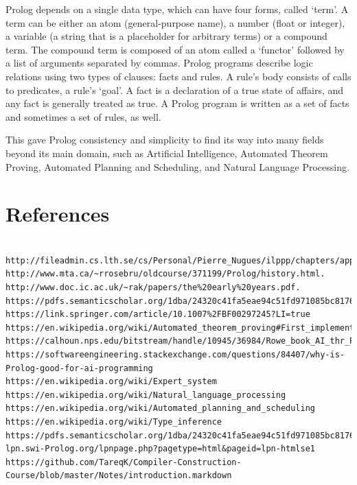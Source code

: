 \documentclass[14pt]{article}
\begin{document}
Prolog depends on a single data type, which can have four forms,
called ‘term’. A term can be either an atom (general-purpose name), a
number (float or integer), a variable (a string that is a placeholder
for arbitrary terms) or a compound term. The compound term is composed
of an atom called a ‘functor’ followed by a list of arguments
separated by commas. Prolog programs describe logic relations using two
types of clauses: facts and rules. A rule’s body consists of calls to
predicates, a rule’s ‘goal’. A fact is a declaration of a true state
of affairs, and any fact is generally treated as true. A Prolog
program is written as a set of facts and sometimes a set of rules, as
well.

This gave Prolog consistency and simplicity to find its way into many
fields beyond its main domain, such as Artificial Intelligence,
Automated Theorem Proving, Automated Planning and Scheduling, and
Natural Language Processing.

\newpage
\section{References} 
\begin{verbatim}
	
http://fileadmin.cs.lth.se/cs/Personal/Pierre_Nugues/ilppp/chapters/appA.pdf.
http://www.mta.ca/~rrosebru/oldcourse/371199/Prolog/history.html. 
http://www.doc.ic.ac.uk/~rak/papers/the%20early%20years.pdf.
https://pdfs.semanticscholar.org/1dba/24320c41fa5eae94c51fd971085bc8176dd7.pdf
https://link.springer.com/article/10.1007%2FBF00297245?LI=true
https://en.wikipedia.org/wiki/Automated_theorem_proving#First_implementations
https://calhoun.nps.edu/bitstream/handle/10945/36984/Rowe_book_AI_thr_Prolog_preface.pdf https://softwareengineering.stackexchange.com/questions/84407/why-is-Prolog-good-for-ai-programming
https://en.wikipedia.org/wiki/Expert_system
https://en.wikipedia.org/wiki/Natural_language_processing 
https://en.wikipedia.org/wiki/Automated_planning_and_scheduling 
https://en.wikipedia.org/wiki/Type_inference https://pdfs.semanticscholar.org/1dba/24320c41fa5eae94c51fd971085bc8176dd7.pdfhttps://en.wikipedia.org/wiki/Prolog
lpn.swi-Prolog.org/lpnpage.php?pagetype=html&pageid=lpn-htmlse1
https://github.com/TareqK/Compiler-Construction-Course/blob/master/Notes/introduction.markdown
\end{verbatim}
\end{document}
